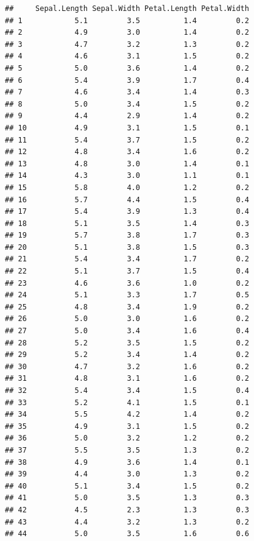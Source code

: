 \documentclass[]{book}
\theoremstyle{definition}
\theoremstyle{definition}
\theoremstyle{definition}
\theoremstyle{remark}
\begin{document}
\begin{verbatim}
##     Sepal.Length Sepal.Width Petal.Length Petal.Width
## 1            5.1         3.5          1.4         0.2
## 2            4.9         3.0          1.4         0.2
## 3            4.7         3.2          1.3         0.2
## 4            4.6         3.1          1.5         0.2
## 5            5.0         3.6          1.4         0.2
## 6            5.4         3.9          1.7         0.4
## 7            4.6         3.4          1.4         0.3
## 8            5.0         3.4          1.5         0.2
## 9            4.4         2.9          1.4         0.2
## 10           4.9         3.1          1.5         0.1
## 11           5.4         3.7          1.5         0.2
## 12           4.8         3.4          1.6         0.2
## 13           4.8         3.0          1.4         0.1
## 14           4.3         3.0          1.1         0.1
## 15           5.8         4.0          1.2         0.2
## 16           5.7         4.4          1.5         0.4
## 17           5.4         3.9          1.3         0.4
## 18           5.1         3.5          1.4         0.3
## 19           5.7         3.8          1.7         0.3
## 20           5.1         3.8          1.5         0.3
## 21           5.4         3.4          1.7         0.2
## 22           5.1         3.7          1.5         0.4
## 23           4.6         3.6          1.0         0.2
## 24           5.1         3.3          1.7         0.5
## 25           4.8         3.4          1.9         0.2
## 26           5.0         3.0          1.6         0.2
## 27           5.0         3.4          1.6         0.4
## 28           5.2         3.5          1.5         0.2
## 29           5.2         3.4          1.4         0.2
## 30           4.7         3.2          1.6         0.2
## 31           4.8         3.1          1.6         0.2
## 32           5.4         3.4          1.5         0.4
## 33           5.2         4.1          1.5         0.1
## 34           5.5         4.2          1.4         0.2
## 35           4.9         3.1          1.5         0.2
## 36           5.0         3.2          1.2         0.2
## 37           5.5         3.5          1.3         0.2
## 38           4.9         3.6          1.4         0.1
## 39           4.4         3.0          1.3         0.2
## 40           5.1         3.4          1.5         0.2
## 41           5.0         3.5          1.3         0.3
## 42           4.5         2.3          1.3         0.3
## 43           4.4         3.2          1.3         0.2
## 44           5.0         3.5          1.6         0.6

\end{verbatim}
\end{document}
